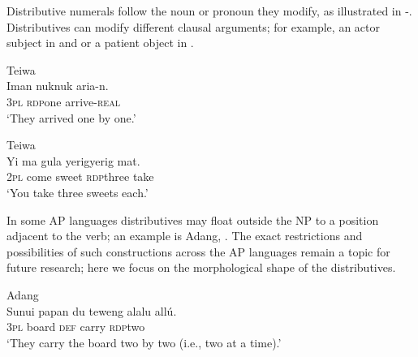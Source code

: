 Distributive numerals follow the noun or pronoun they modify, as illustrated in -. Distributives can modify different clausal arguments; for example, an actor subject in  and  or a patient object in .


\ea%
\label{bkm:Ref342655549}
{\upshape Teiwa}\\
\gll Iman  nuk\textit{{\Tilde}}nuk  aria-n.\\  
    \textsc{3pl}   \textsc{rdp}\textit{{\Tilde}}one   arrive-\textsc{real}\\
\glt `They arrived one by one.' 
\z

    

   

    
 

   

   

\ea%
\label{bkm:Ref342655553}
{\upshape Teiwa}\\
\gll Yi   ma   gula   yerig{\Tilde}yerig   mat.\\  
     2\textsc{pl } come  sweet  \textsc{rdp}\textit{{\Tilde}}three  take \\
\glt `You take three sweets each.'
\z

   

  

   

In some AP languages distributives may float outside the NP to a position adjacent to the verb; an example is Adang, . The exact restrictions and possibilities of such constructions across the AP languages remain a topic for future research; here we focus on the morphological shape of the distributives.


\ea
\label{ex:8:1235}
{\upshape Adang}\\
 \gll  Sunui{\textltailn}   papan   du   teweng al{\Tilde}alu  {\ob}all\'u{\cb}.\\
   3\textsc{pl}    board  \textsc{def}   carry   \textsc{rdp}{\Tilde}two \\
 \glt `They carry the board two by two (i.e., two at a time).'
\z

